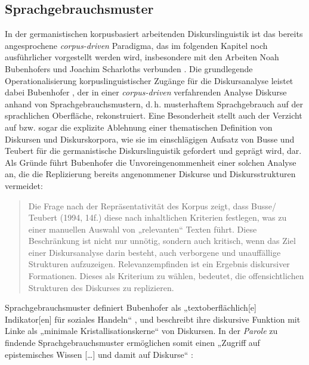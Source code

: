 \subsection{Sprachgebrauchsmuster}\label{sprachgebrauchsmuster}

In der germanistischen korpusbasiert arbeitenden Diskurslinguistik ist das bereits angesprochene \emph{corpus-driven} Paradigma, das im folgenden Kapitel noch ausführlicher vorgestellt werden wird, insbesondere mit den Arbeiten Noah Bubenhofers und Joachim Scharloths verbunden \autocites[siehe zu \emph{corpus-driven} Zugängen in der Phraseologie und Grammatik etwa][]{belicaKorpusanalytischeZugangeSprachlichem2008, brunnerCorpusDrivenStudyMultiWord2007, kupietzGebrauchsbasierteGrammatikStatistische2009}. Die grundlegende Operationalisierung korpuslinguistischer Zugänge für die Diskursanalyse leistet dabei Bubenhofer \autocite*{bubenhoferSprachgebrauchsmusterKorpuslinguistikAls2009}, der in einer \emph{corpus-driven} verfahrenden Analyse Diskurse anhand von Sprachgebrauchsmustern, d.\,h. musterhaftem Sprachgebrauch auf der sprachlichen Oberfläche, rekonstruiert. Eine Besonderheit stellt auch der Verzicht auf bzw. sogar die explizite Ablehnung einer thematischen Definition von Diskursen und Diskurskorpora, wie sie im einschlägigen Aufsatz von Busse und Teubert \autocite*{busseIstDiskursSprachwissenschaftliches1994} für die germanistische Diskurslinguistik gefordert und geprägt wird, dar. Als Gründe führt Bubenhofer die Unvoreingenommenheit einer solchen Analyse an, die die Replizierung bereits angenommener Diskurse und Diskursstrukturen vermeidet:

\begin{quote}
Die Frage nach der Repräsentativität des Korpus zeigt, dass Busse/ Teubert (1994, 14f.) diese nach inhaltlichen Kriterien festlegen, was zu einer manuellen Auswahl von „relevanten`` Texten führt. Diese Beschränkung ist nicht nur unnötig, sondern auch kritisch, wenn das Ziel einer Diskursanalyse darin besteht, auch verborgene und unauffällige Strukturen aufzuzeigen. Relevanzempfinden ist ein Ergebnis diskursiver Formationen. Dieses als Kriterium zu wählen, bedeutet, die offensichtlichen Strukturen des Diskurses zu replizieren. \autocite[36]{bubenhoferSprachgebrauchsmusterKorpuslinguistikAls2009}
\end{quote}

Sprachgebrauchsmuster definiert Bubenhofer als „textoberflächlich{[}e{]} Indikator{[}en{]} für soziales Handeln`` \autocite*[55]{bubenhoferSprachgebrauchsmusterKorpuslinguistikAls2009}, und beschreibt ihre diskursive Funktion mit Linke als „minimale Kristallisationskerne`` \autocite*[40]{linkeBegriffsgeschichteDiskursgeschichteSprachgebrauchsgeschichte2003} von Diskursen. In der \emph{Parole} zu findende Sprachgebrauchsmuster ermöglichen somit einen „Zugriff auf epistemisches Wissen {[}\ldots{]} und damit auf Diskurse`` \autocite[53]{bubenhoferSprachgebrauchsmusterKorpuslinguistikAls2009}:

